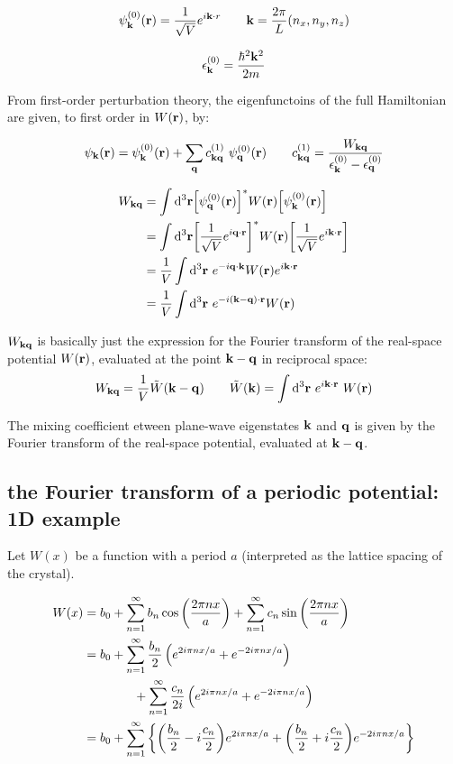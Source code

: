 \documentclass[10pt, a4paper, twocolumn]{article}
\begin{document}
\[\psi _{\vb k}^{(0)} (\vb r) = \frac{1}{\sqrt V}
e^{i\vb k \cdot r}
\qquad \vb k = \frac{2\pi}{L}(n_x,n_y,n_z) \]

\[\epsilon _{\vb k}^{(0)} = \frac{\hbar ^2\vb k^2}{2m} \]

From first-order perturbation theory, the eigenfunctoins of the full Hamiltonian are given, to first order in $W(\vb r)$, by:

\[\psi _{\vb k}(\vb r) = \psi _{\vb k}^{(0)} (\vb r)
+\sum _{\vb q} c_{\vb{kq}}^{(1)}
\ \psi _{\vb q}^{(0)} (\vb r)
\qquad c_{\vb{kq}}^{(1)}
=\frac{W_{\vb{kq}}}{\epsilon _{\vb k}^{(0)}
-\epsilon _{\vb q}^{(0)}} \]

\begin{equation*}
\begin{aligned}
W_{\vb{kq}} &= \int \dd ^3\vb r
\qty[\psi _{\vb q}^{(0)}(\vb r)]^*
W(\vb r)
\qty[ \psi _{\vb k}^{(0)} (\vb r)]
\\ &= \int \dd ^3\vb r
\qty[\frac{1}{\sqrt V} e^{i\vb q \cdot \vb r}]^*
W(\vb r)
\qty[\frac{1}{\sqrt V} e^{i\vb k \cdot \vb r}]
\\&= \frac1V \int \dd ^3\vb r \ e^{-i\vb q \cdot\vb k}
W(\vb r)
e^{i\vb k \cdot \vb r}
\\&= \frac1V \int \dd ^3\vb r
\ e^{-i(\vb k - \vb q)\cdot \vb r}
W(\vb r)
\end{aligned}
\end{equation*}

$W_{\vb{kq}}$ is basically just the expression for the Fourier transform of the real-space potential $W(\vb r)$, evaluated at the point $\vb k - \vb q$ in reciprocal space:
\[W_{\vb{kq}}=\frac1V\tilde W (\vb k - \vb q)
\qquad \tilde W(\vb k) = \int \dd ^3 \vb r
\ e^{i\vb k \cdot \vb r} \ W(\vb r) \]

The mixing coefficient etween plane-wave eigenstates $\vb k$ and $\vb q$ is given by the Fourier transform of the real-space potential, evaluated at $\vb k - \vb q$.

\subsection{the Fourier transform of a periodic potential: 1D example}

Let $W(x)$ be a function with a period $a$ (interpreted as the lattice spacing of the crystal).

\begin{equation*}
\begin{aligned}
W(x)&=b_0
+ \sum _{n=1}^\infty b_n \cos \qty(\frac{2\pi nx}{a})
+ \sum _{n=1}^\infty c_n \sin \qty(\frac{2\pi nx}{a})
\\&= b_0 +
\sum _{n=1}^{\infty} \frac{b_n}{2} \left(
e^{2i\pi n x/a} + e^{-2i\pi n x/a} \right)
\\&\qquad \qquad
+ \sum _{n=1}^{\infty} \frac{c_n}{2i} \left(
e^{2i\pi n x/a} + e^{-2i\pi n x/a} \right)
\\&= b_0 + \sum _{n=1}^\infty
\left\{ \qty(\frac{b_n}{2} - i\frac{c_n}{2})
e^{2i\pi nx/a}
+ \qty(\frac{b_n}{2} + i\frac{c_n}{2})
e^{-2i\pi nx/a} \right\}
\end{aligned}
\end{equation*}
\end{document}
